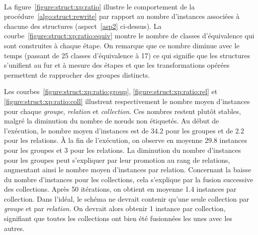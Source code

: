 \paragraph{}
La figure~\ref{figure:struct:xp:ratio} illustre le comportement de la procédure~\ref{algo:struct:rewrite} par rapport au nombre d'instances associées à chacune des structures (aspect~\ref{asp2} ci-dessus).
La courbe~\ref{figure:struct:xp:ratio:equiv} montre le nombre de classes d'équivalence qui sont construites à chaque étape.
On remarque que ce nombre diminue avec le temps (passant de \num{25} classes d'équivalence à \num{17}) ce qui signifie que les structures s'unifient au fur et à mesure des étapes et que les transformations opérées permettent de rapprocher des groupes distincts.

Les courbes~\ref{figure:struct:xp:ratio:group}, \ref{figure:struct:xp:ratio:rel} et \ref{figure:struct:xp:ratio:coll} illustrent respectivement le nombre moyen d'instances pour chaque \emph{groupe}, \emph{relation} et \emph{collection}.
Ces nombres restent plutôt stables, malgré la diminution du nombre de nœuds non étiquetés.
Au début de l'exécution, le nombre moyen d'instances est de \num{34.2} pour les groupes et de \num{2.2} pour les relations.
À la fin de l'exécution, on observe en moyenne \num{29.8} instances pour les groupes et \num{3} pour les relations.
La diminution du nombre d'instances pour les groupes peut s'expliquer par leur promotion au rang de relations, augmentant ainsi le nombre moyen d'instances par relation.
Concernant la baisse du nombre d'instances pour les collections, cela s'explique par la fusion successive des collections.
Après \num{50} itérations, on obtient en moyenne \num{1.4} instances par collection.
Dans l'idéal, le schéma ne devrait contenir qu'une seule collection par \emph{groupe} et par \emph{relation}.
On devrait alors obtenir \num{1} instance par collection, signifiant que toutes les collections ont bien été fusionnées les unes avec les autres.

